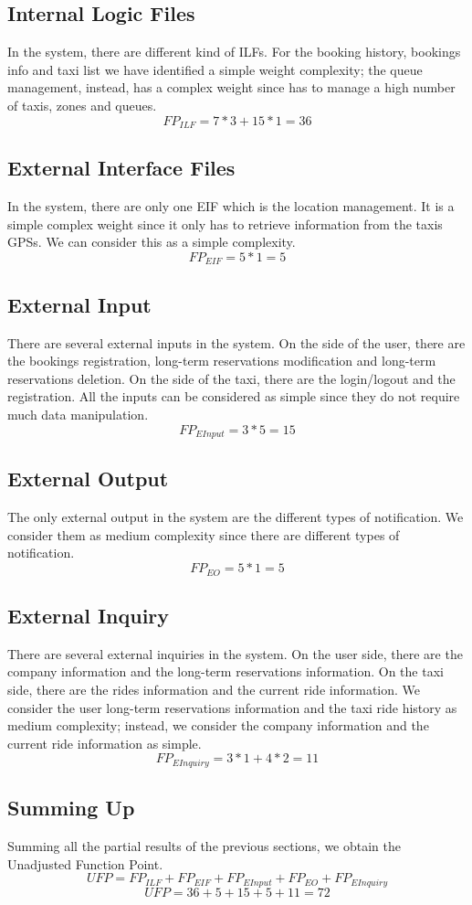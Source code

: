 \subsection{Internal Logic Files}
In the system, there are different kind of ILFs. For the booking history, bookings info and taxi list we have identified a simple weight complexity; the queue management, instead, has a complex weight since has to manage a high number of taxis, zones and queues.
$$FP_{ILF}=7*3+15*1=36$$
\subsection{External Interface Files}
In the system, there are only one EIF which is the location management. It is a simple complex weight since it only has to retrieve information from the taxis GPSs. We can consider this as a simple complexity.$$FP_{EIF}=5*1=5$$
\subsection{External Input}
There are several external inputs in the system. On the side of the user, there are the bookings registration, long-term reservations modification and long-term reservations deletion. On the side of the taxi, there are the login/logout and the registration. All the inputs can be considered as simple since they do not require much data manipulation. $$FP_{EInput}=3*5=15$$
\subsection{External Output}
The only external output in the system are the different types of notification. We consider them as medium complexity since there are different types of notification. $$FP_{EO}=5*1=5$$
\subsection{External Inquiry}
There are several external inquiries in the system. On the user side, there are the company information and the long-term reservations information. On the taxi side, there are the rides information and the current ride information. We consider the user long-term reservations information and the taxi ride history as medium complexity; instead, we consider the company information and the current ride information as simple. $$FP_{EInquiry}=3*1+4*2=11$$

\subsection{Summing Up}
Summing all the partial results of the previous sections, we obtain the Unadjusted Function Point.
$$UFP=FP_{ILF}+FP_{EIF}+FP_{EInput}+FP_{EO}+FP_{EInquiry}$$ $$UFP=36+5+15+5+11=72$$